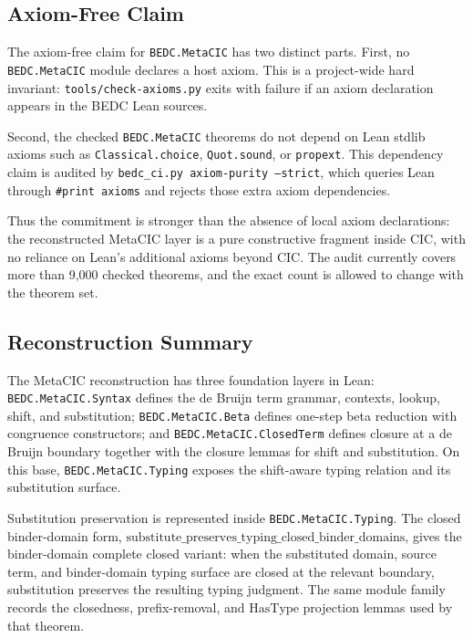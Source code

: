\subsection{Axiom-Free Claim}\label{subsec:reconstruction-axiom-free-claim}

The axiom-free claim for \texttt{BEDC.MetaCIC} has two distinct parts. First,
no \texttt{BEDC.MetaCIC} module declares a host axiom. This is a project-wide
hard invariant: \texttt{tools/check-axioms.py} exits with failure if an axiom
declaration appears in the BEDC Lean sources.

Second, the checked \texttt{BEDC.MetaCIC} theorems do not depend on Lean
stdlib axioms such as \texttt{Classical.choice}, \texttt{Quot.sound}, or
\texttt{propext}. This dependency claim is audited by
\texttt{bedc\_ci.py axiom-purity --strict}, which queries Lean through
\texttt{\#print axioms} and rejects those extra axiom dependencies.

Thus the commitment is stronger than the absence of local axiom declarations:
the reconstructed MetaCIC layer is a pure constructive fragment inside CIC,
with no reliance on Lean's additional axioms beyond CIC. The audit currently
covers more than 9,000 checked theorems, and the exact count is allowed to
change with the theorem set.

\subsection{Reconstruction Summary}\label{subsec:reconstruction-summary}

The MetaCIC reconstruction has three foundation layers in Lean:
\texttt{BEDC.MetaCIC.Syntax} defines the de Bruijn term grammar, contexts,
lookup, shift, and substitution; \texttt{BEDC.MetaCIC.Beta} defines
one-step beta reduction with congruence constructors; and
\texttt{BEDC.MetaCIC.ClosedTerm} defines closure at a de Bruijn boundary
together with the closure lemmas for shift and substitution. On this base,
\texttt{BEDC.MetaCIC.Typing} exposes the shift-aware typing relation and its
substitution surface.

Substitution preservation is represented inside
\texttt{BEDC.MetaCIC.Typing}. The closed binder-domain form,
$\mathrm{substitute\_preserves\_typing\_closed\_binder\_domains}$,
gives the binder-domain complete closed variant: when the substituted
domain, source term, and binder-domain typing surface are closed at the
relevant boundary, substitution preserves the resulting typing judgment.
The same module family records the closedness, prefix-removal, and
$\mathrm{HasType}$ projection lemmas used by that theorem.

